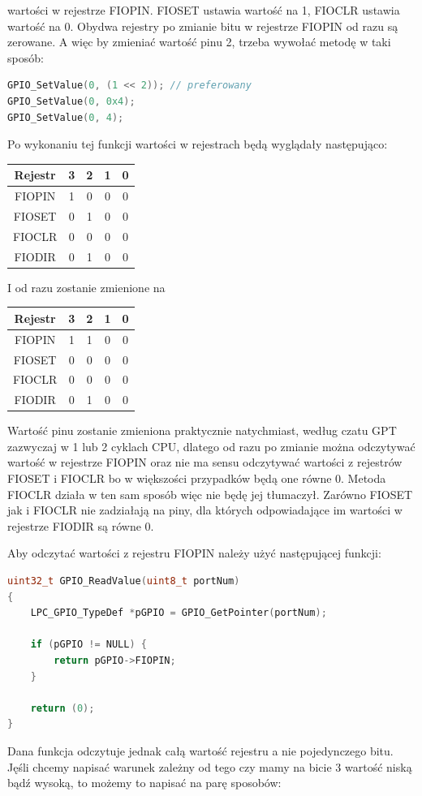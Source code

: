 \documentclass[11pt]{article}
\begin{document}
wartości w rejestrze FIOPIN. FIOSET ustawia wartość na 1, FIOCLR ustawia wartość na 0.
Obydwa rejestry po zmianie bitu w rejestrze FIOPIN od razu są zerowane. A więc by zmieniać
wartość pinu 2, trzeba wywołać metodę w taki sposób:
\begin{lstlisting}[language=c]
GPIO_SetValue(0, (1 << 2)); // preferowany
GPIO_SetValue(0, 0x4);
GPIO_SetValue(0, 4);
\end{lstlisting}
Po wykonaniu tej funkcji wartości w rejestrach będą wyglądały następująco:
\begin{table}[H]
    \centering
    \begin{tabular}{|c|c|c|c|c|}
        \hline
        Rejestr & 3 & 2 & 1 & 0 \\ \hline
        FIOPIN & 1 & 0 & 0 & 0 \\ \hline
        FIOSET & 0 & 1 & 0 & 0 \\ \hline
        FIOCLR & 0 & 0 & 0 & 0 \\ \hline
        FIODIR & 0 & 1 & 0 & 0 \\ \hline
    \end{tabular}
\end{table}
I od razu zostanie zmienione na
\begin{table}[H]
    \centering
    \begin{tabular}{|c|c|c|c|c|}
        \hline
        Rejestr & 3 & 2 & 1 & 0 \\ \hline
        FIOPIN & 1 & 1 & 0 & 0 \\ \hline
        FIOSET & 0 & 0 & 0 & 0 \\ \hline
        FIOCLR & 0 & 0 & 0 & 0 \\ \hline
        FIODIR & 0 & 1 & 0 & 0 \\ \hline
    \end{tabular}
\end{table}
Wartość pinu zostanie zmieniona praktycznie natychmiast, według czatu GPT zazwyczaj w 1 lub 2
cyklach CPU, dlatego od razu po zmianie można odczytywać wartość w rejestrze FIOPIN oraz
nie ma sensu odczytywać wartości z rejestrów FIOSET i FIOCLR bo w większości przypadków
będą one równe 0. Metoda FIOCLR działa w ten sam sposób więc nie będę jej tłumaczył.
Zarówno FIOSET jak i FIOCLR nie zadziałają na piny, dla których odpowiadające im wartości
w rejestrze FIODIR są równe 0.

Aby odczytać wartości z rejestru FIOPIN należy użyć następującej funkcji:
\begin{lstlisting}[language=c]
uint32_t GPIO_ReadValue(uint8_t portNum)
{
	LPC_GPIO_TypeDef *pGPIO = GPIO_GetPointer(portNum);

	if (pGPIO != NULL) {
		return pGPIO->FIOPIN;
	}

	return (0);
}
\end{lstlisting}
\newpage
Dana funkcja odczytuje jednak całą wartość rejestru a nie pojedynczego bitu.
Jęśli chcemy napisać warunek zależny od tego czy mamy na bicie 3 wartość niską bądź
wysoką, to możemy to napisać na parę sposobów:
\end{document}
